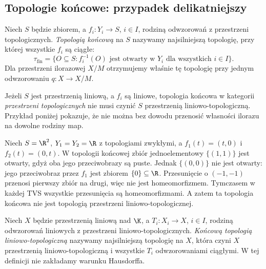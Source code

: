 \subsection{Topologie końcowe: przypadek delikatniejszy}

\begin{definicja}
Niech $S$ będzie zbiorem, a $f_i:Y_i\to S$, $i\in I$,
rodziną odwzorowań z przestrzeni topologicznych.
\emph{Topologią końcową} na $S$ nazywamy najsilniejszą
topologię, przy której wszystkie $f_i$ są ciągłe:
\[
 \tau_{\mathrm{fin}}=\{O\subseteq S:
    f_i^{-1}(O)\text{ jest otwarty w }Y_i
    \text{ dla wszystkich }i\in I\}.
\]
Dla przestrzeni ilorazowej $X/M$ otrzymujemy właśnie
tę topologię przy jednym odwzorowaniu $q:X\to X/M$.
\end{definicja}

\begin{uwaga}
Jeżeli $S$ jest przestrzenią liniową, a $f_i$ są liniowe,
topologia końcowa w kategorii \emph{przestrzeni topologicznych}
nie musi czynić $S$ przestrzenią liniowo-topologiczną.
Przykład poniżej pokazuje, że nie można bez dowodu
przenosić własności ilorazu na dowolne rodziny map.
\end{uwaga}

\begin{przyklad}\label{ex:final-cross}
Niech $S=\R^2$, $Y_1=Y_2=\R$ z topologiami zwykłymi,
a $f_1(t)=(t,0)$ i $f_2(t)=(0,t)$. W topologii końcowej
zbiór jednoelementowy $\{(1,1)\}$ jest otwarty,
gdyż oba jego przeciwobrazy są puste. Jednak $\{(0,0)\}$
nie jest otwarty: jego przeciwobraz przez $f_1$ jest
zbiorem $\{0\}\subseteq\R$. Przesunięcie o $(-1,-1)$
przenosi pierwszy zbiór na drugi, więc nie jest
homeomorfizmem. Tymczasem w każdej TVS wszystkie
przesunięcia są homeomorfizmami. A zatem ta topologia
końcowa nie jest topologią przestrzeni liniowo-topologicznej.
\end{przyklad}

\begin{definicja}
Niech $X$ będzie przestrzenią liniową nad $\K$, a
$T_i:X_i\to X$, $i\in I$, rodziną odwzorowań
liniowych z przestrzeni liniowo-topologicznych.
\emph{Końcową topologią liniowo-topologiczną}
nazywamy najsilniejszą topologię na $X$, która czyni $X$
przestrzenią liniowo-topologiczną i wszystkie $T_i$
odwzorowaniami ciągłymi. W tej definicji nie zakładamy
warunku Hausdorffa.
\end{definicja}


